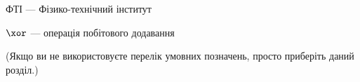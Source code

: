 ФТІ --- Фізико-технічний інститут

$\xor$ --- операція побітового додавання  %


(Якщо ви не використовуєте перелік умовних позначень, просто приберіть 
даний розділ.)